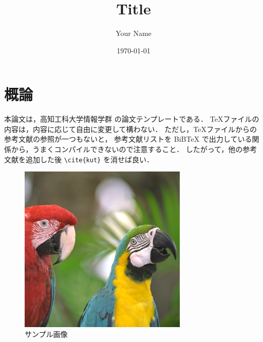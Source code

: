 \documentclass[mingoth]{kut-paper}
\title{Title}
\author{Your Name}
\date{\today}
\begin{document}
\maketitle

\chapter{概論}

本論文は，高知工科大学情報学群 \cite{kut} の論文テンプレートである．
\TeX ファイルの内容は，内容に応じて自由に変更して構わない．
ただし，\TeX ファイルからの参考文献の参照が一つもないと，
参考文献リストを BiBTeX で出力している関係から，うまくコンパイルできないので注意すること．
したがって，他の参考文献を追加した後 \verb|\cite{kut}| を消せば良い．

\begin{figure}[ht]
  \centering
  \includegraphics[width=8cm]{images/Parrots.bmp}
  \caption{サンプル画像}
  \label{fig:sample}
\end{figure}




%
%   
%   
\end{document}
